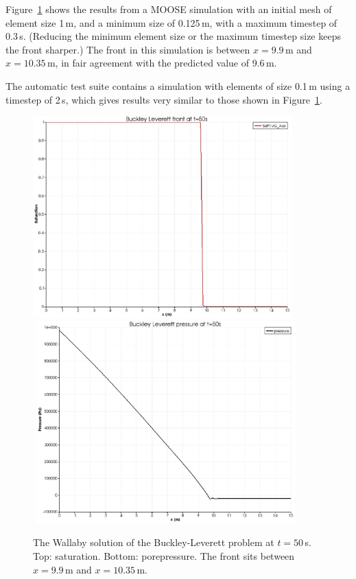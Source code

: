 \documentclass[]{scrreprt}
\begin{document}
Figure~\ref{satfront.figa} shows the results from a MOOSE simulation
with an initial mesh of element size 1\,m, and a minimum size of
0.125\,m, with a maximum timestep of 0.3\,s.  (Reducing the minimum
element size or the maximum timestep size keeps the front sharper.)
The front in this simulation is between $x=9.9$\,m and $x=10.35$\,m,
in fair agreement with the predicted value of 9.6\,m.

The automatic test suite contains a simulation with elements of size
0.1\,m using a timestep of 2\,s, which gives results very similar to
those shown in Figure~\ref{satfront.figa}.

\begin{figure}[htb]
\begin{center}
\includegraphics[width=10cm]{bl_seff.eps} \\
$\mbox{}$
\includegraphics[width=10cm]{bl_p.eps} \\
\caption{The Wallaby solution of the Buckley-Leverett problem at
  $t=50$\,s.  Top: saturation.  Bottom: porepressure.  The front sits
  between $x=9.9$\,m and $x=10.35$\,m.}
\label{satfront.figa}
\end{center}
\end{figure}
\end{document}
